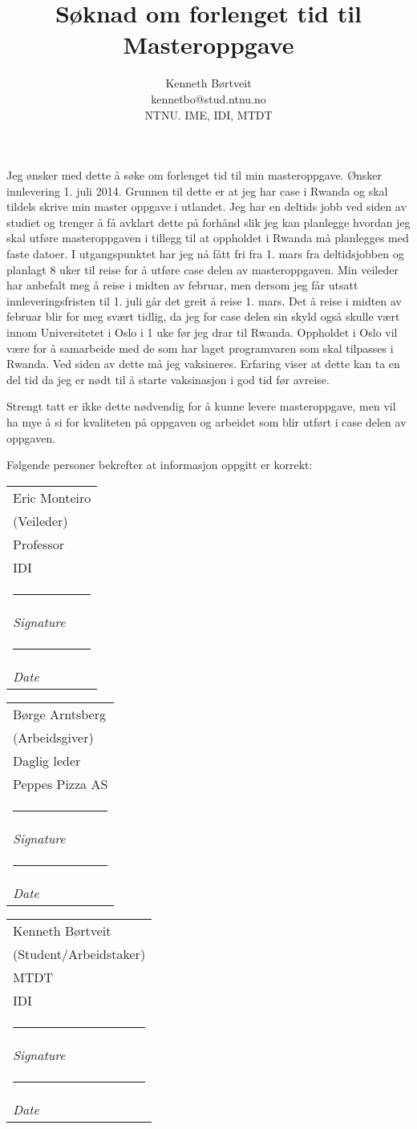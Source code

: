 \documentclass[a4paper, 11pt]{article}
\title{Søknad om forlenget tid til Masteroppgave}
\author{Kenneth Børtveit \\ kennetbo@stud.ntnu.no \\ NTNU. IME, IDI, MTDT}
\makeatletter
\newcommand{\namesigdate}[2][5cm]{%
  \begin{tabular}{@{}p{#1}@{}}
    #2 \\[2\normalbaselineskip] \hrule \\[0pt]
    {\small \textit{Signature}} \\[2\normalbaselineskip] \hrule \\[0pt]
    {\small \textit{Date}}
  \end{tabular}
}
\makeatother
\begin{document}
\maketitle
Jeg ønsker med dette å søke om forlenget tid til min masteroppgave. Ønsker innlevering 1. juli 2014.
Grunnen til dette er at jeg har case i Rwanda og skal tildels skrive min master oppgave i utlandet.
Jeg har en deltids jobb ved siden av studiet og trenger å få avklart dette på forhånd slik jeg kan planlegge hvordan jeg skal utføre masteroppgaven i tillegg til at oppholdet i Rwanda må planlegges med faste datoer.
I utgangspunktet har jeg nå fått fri fra 1. mars fra deltidsjobben og planlagt 8 uker til reise for å utføre case delen av masteroppgaven. 
Min veileder har anbefalt meg å reise i midten av februar, men dersom jeg får utsatt innleveringsfristen til 1. juli går det greit å reise 1. mars.
Det å reise i midten av februar blir for meg svært tidlig, da jeg for case delen sin skyld også skulle vært innom Universitetet i Oslo i 1 uke før jeg drar til Rwanda.
Oppholdet i Oslo vil være for å samarbeide med de som har laget programvaren som skal tilpasses i Rwanda. Ved siden av dette må jeg vaksineres. Erfaring viser at dette kan ta en del tid da jeg er nødt til å starte vaksinasjon i god tid før avreise.

Strengt tatt er ikke dette nødvendig for å kunne levere masteroppgave, men vil ha mye å si for kvaliteten på oppgaven og arbeidet som blir utført i case delen av oppgaven.

Følgende personer bekrefter at informasjon oppgitt er korrekt: \\


\noindent \namesigdate[6cm]{Eric Monteiro \\ (Veileder) \\ Professor \\ IDI} \namesigdate[4cm]{Børge Arntsberg \\ (Arbeidsgiver) \\ Daglig leder \\ Peppes Pizza AS} \namesigdate[4cm]{Kenneth Børtveit \\ (Student/Arbeidstaker) \\ MTDT \\ IDI}
\end{document}
